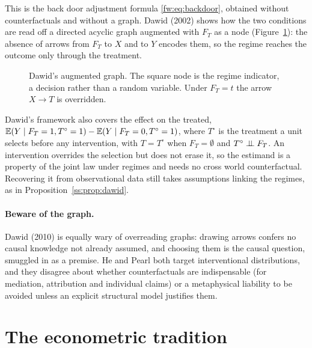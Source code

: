 This is the back door adjustment formula \eqref{fw:eq:backdoor}, obtained without counterfactuals and without a graph. Dawid (2002) shows how the two conditions are read off a directed acyclic graph augmented with $F_T$ as a node (Figure~\ref{ss:fig:dawid}): the absence of arrows from $F_T$ to $X$ and to $Y$ encodes them, so the regime reaches the outcome only through the treatment.

\begin{figure}[ht]
\centering
{}
\caption{Dawid's augmented graph. The square node is the regime indicator, a decision rather than a random variable. Under $F_T=t$ the arrow $X\to T$ is overridden.}
\label{ss:fig:dawid}
\end{figure}

\begin{remark}
Dawid's framework also covers the effect on the treated, $\mathbb{E}(Y\mid F_T=1,T^\circ=1)-\mathbb{E}(Y\mid F_T=0,T^\circ=1)$, where $T^\circ$ is the treatment a unit selects before any intervention, with $T=T^\circ$ when $F_T=\emptyset$ and $T^\circ\perp\!\!\!\perp F_T$. An intervention overrides the selection but does not erase it, so the estimand is a property of the joint law under regimes and needs no cross world counterfactual. Recovering it from observational data still takes assumptions linking the regimes, as in Proposition~\ref{ss:prop:dawid}.
\end{remark}

\paragraph{Beware of the graph.} Dawid (2010) is equally wary of overreading graphs: drawing arrows confers no causal knowledge not already assumed, and choosing them is the causal question, smuggled in as a premise. He and Pearl both target interventional distributions, and they disagree about whether counterfactuals are indispensable (for mediation, attribution and individual claims) or a metaphysical liability to be avoided unless an explicit structural model justifies them.

\section{The econometric tradition}\label{fw:sec:econ}


